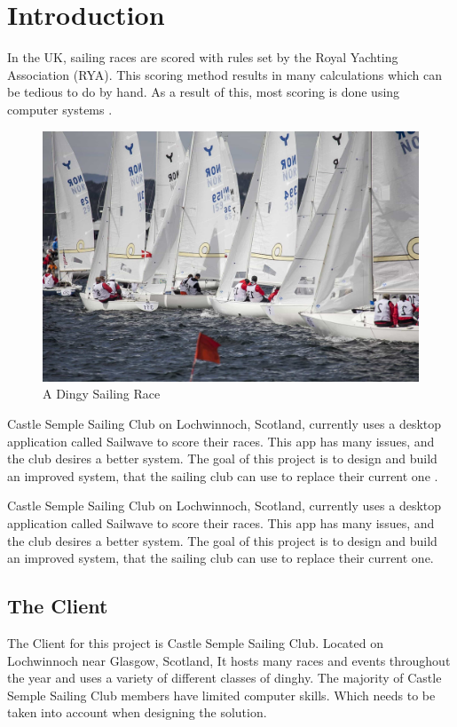 \documentclass{l4proj}
\begin{document}
\chapter{Introduction}


In the UK, sailing races are scored with rules set by the Royal Yachting Association (RYA).
This scoring method results in many calculations which can be tedious to do by hand. As a result of this, most scoring is done using computer systems \citep{RYAscore}.

\begin{figure}[h!]
    \centering
    \includegraphics[width=0.6\linewidth]{images/SailingRace.jpg} 

    \caption{A Dingy Sailing Race \citep{SailingRace}
    }

    \label{fig:SailingRace} 
\end{figure}

Castle Semple Sailing Club on Lochwinnoch, Scotland, currently uses a desktop application called Sailwave to score their races. This app has many issues, and the club desires a better system. The goal of this project is to design and build an improved system, that the sailing club can use to replace their current one \citep{RYAscore}.

Castle Semple Sailing Club on Lochwinnoch, Scotland, currently uses a desktop application called Sailwave to score their races. This app has many issues, and the club desires a better system. The goal of this project is to design and build an improved system, that the sailing club can use to replace their current one.

\section{The Client}
The Client for this project is Castle Semple Sailing Club. Located on Lochwinnoch near Glasgow, Scotland, It hosts many races and events throughout the year and uses a variety of different classes of dinghy. The majority of Castle Semple Sailing Club members have limited computer skills. Which needs to be taken into account when designing the solution.
\end{document}
